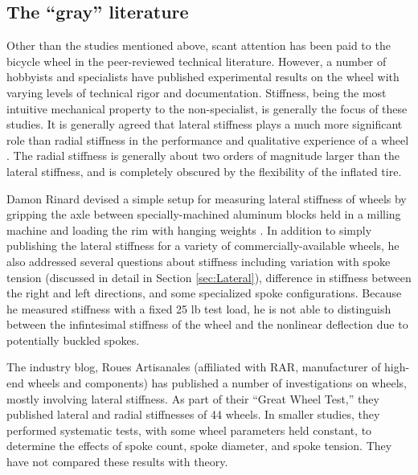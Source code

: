 \documentclass[../thesis.tex]{subfiles}
\begin{document}

\subsection{The ``gray'' literature}

Other than the studies mentioned above, scant attention has been paid to the bicycle wheel in the peer-reviewed technical literature. However, a number of hobbyists and specialists have published experimental results on the wheel with varying levels of technical rigor and documentation. Stiffness, being the most intuitive mechanical property to the non-specialist, is generally the focus of these studies. It is generally agreed that lateral stiffness plays a much more significant role than radial stiffness in the performance and qualitative experience of a wheel \cite{Kopecky2013}. The radial stiffness is generally about two orders of magnitude larger than the lateral stiffness, and is completely obscured by the flexibility of the inflated tire.

Damon Rinard devised a simple setup for measuring lateral stiffness of wheels by gripping the axle between specially-machined aluminum blocks held in a milling machine and loading the rim with hanging weights \cite{Rinard}. In addition to simply publishing the lateral stiffness for a variety of commercially-available wheels, he also addressed several questions about stiffness including variation with spoke tension (discussed in detail in Section \ref{sec:Lateral}), difference in stiffness between the right and left directions, and some specialized spoke configurations. Because he measured stiffness with a fixed 25 lb test load, he is not able to distinguish between the infintesimal stiffness of the wheel and the nonlinear deflection due to potentially buckled spokes.

The industry blog, Roues Artisanales \cite{RARblog} (affiliated with RAR, manufacturer of high-end wheels and components) has published a number of investigations on wheels, mostly involving lateral stiffness. As part of their ``Great Wheel Test,'' they published lateral and radial stiffnesses of 44 wheels. In smaller studies, they performed systematic tests, with some wheel parameters held constant, to determine the effects of spoke count, spoke diameter, and spoke tension. They have not compared these results with theory.
\end{document}
